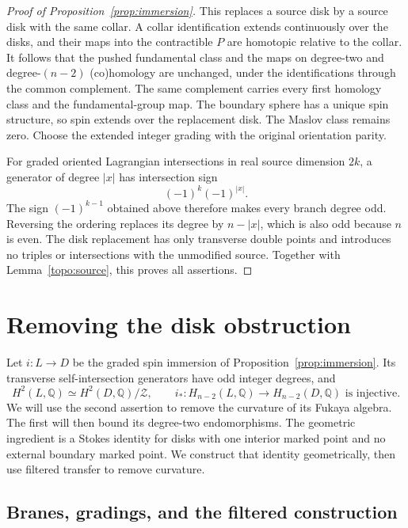 \documentclass[11pt]{article}
\numberwithin{equation}{section}
\theoremstyle{definition}
\theoremstyle{remark}
\newcommand{\Q}{\mathbb Q}
\begin{document}
\begin{proof}[Proof of Proposition~\ref{prop:immersion}]
This replaces a source disk by a source disk with the same
collar.  A collar identification extends continuously over
the disks, and their maps into the contractible $P$ are
homotopic relative to the collar.  It follows that the pushed
fundamental class and the maps on degree-two and degree-$(n-2)$
(co)homology are unchanged, under the identifications through
the common complement.  The same complement carries every
first homology class and the fundamental-group map.
The boundary sphere has a unique spin structure, so spin extends
over the replacement disk.  The Maslov class remains zero.
Choose the extended integer grading with the
original orientation parity.

For graded oriented Lagrangian intersections in real source
dimension $2k$, a generator of degree $|x|$ has intersection
sign
\[
 (-1)^k(-1)^{|x|}.
\]
The sign $(-1)^{k-1}$ obtained above therefore makes every
branch degree odd.  Reversing the ordering replaces its degree
by $n-|x|$, which is also odd because $n$ is even.  The disk
replacement has only transverse double points and introduces
no triples or intersections with the unmodified source.
Together with Lemma~\ref{topo:source}, this proves all assertions.
\end{proof}

\section{Removing the disk obstruction}\label{sec:curvature}

Let $i:L\to D$ be the graded spin immersion of
Proposition~\ref{prop:immersion}.  Its transverse self-intersection
generators have odd integer degrees, and
\begin{equation}\label{curv:topological-input}
 H^2(L,\Q)\simeq H^2(D,\Q)/\mathcal Z,
 \qquad
 i_*:H_{n-2}(L,\Q)\longrightarrow H_{n-2}(D,\Q)
 \text{ is injective}.
\end{equation}
We will use the second assertion to remove the curvature of its
Fukaya algebra.  The first will then bound its degree-two endomorphisms.
The geometric ingredient is a Stokes identity for disks with one
interior marked point and no external boundary marked point.  We
construct that identity geometrically, then use filtered transfer to
remove curvature.

\subsection{Branes, gradings, and the filtered construction}
\end{document}
